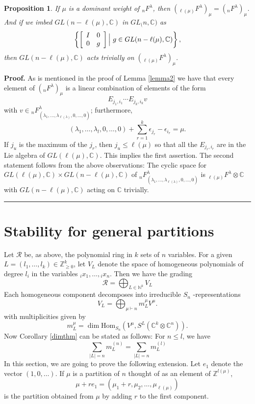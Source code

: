 \documentclass[12pt]{article}%
\newtheorem{proposition}[theorem]{Proposition}
\newenvironment{proof}[1][Proof]{\noindent\textbf{#1.} }{\ \rule{0.5em}{0.5em}}
\begin{document}
\begin{proposition}
\label{proptrivial} If $\mu$ is a dominant weight of ${}_{n}F^{\lambda}$, then
$({}_{\ell(\mu)} F^{\lambda})_{\mu}= ({}_{n}F^{\lambda})_{\mu}$. And if we
imbed $GL(n-\ell(\mu),\mathbb{C})$ in $GL_{(}n,\mathbb{C})$ as
\[
\left\{  \left[
\begin{array}
[c]{cc}%
I & 0\\
0 & g
\end{array}
\right]  \Big|~ g\in GL(n-{\ell(\mu)},\mathbb{C})\right\}  ,
\]
then $GL(n-{\ell(\mu)},\mathbb{C})$ acts trivially on $({}_{\ell(\mu)}
F^{\lambda})_{\mu}$.
\end{proposition}

\begin{proof}
As is mentioned in the proof of Lemma \ref{lemma2} we have that every element
of $({}_{n}F^{\lambda})_{\mu}$ is a linear combination of elements of the
form
\[
E_{j_{1},i_{1}}\cdots E_{j_{k},i_{k}}v
\]
with $v\in{}_{n}F_{(\lambda_{1},\dots,\lambda_{\ell(\lambda)},0,\dots
,0)}^{\lambda}$; furthermore,
\[
(\lambda_{1},\dots,\lambda_{l},0,\dots,0)+\sum_{r=1}^{k}\epsilon_{j_{r}%
}-\epsilon_{i_{r}}=\mu.
\]
If $j_{u}$ is the maximum of the $j_{r}$, then $j_{u}\leq\ell(\mu)$ so that
all the $E_{j_{r},i_{r}}$ are in the Lie algebra of $GL(\ell(\mu),\mathbb{C}%
)$. This implies the first assertion. The second statement follows from the
above observations: The cyclic space for $GL(\ell(\mu),\mathbb{C})\times
GL(n-\ell(\mu),\mathbb{C})$ of ${}_{n}F_{(\lambda_{1},\dots,\lambda
_{\ell(\lambda)},0,\dots,0)}^{\lambda}$ is ${}_{\ell(\mu)}F^{\lambda}%
\otimes\mathbb{C}$ with $GL(n-\ell(\mu),\mathbb{C})$ acting on $\mathbb{C}$ trivially.
\end{proof}

\section{Stability for general partitions}

Let $\mathcal{R}$ be, as above, the polynomial ring in $k$ sets of $n$
variables. For a given $L=(l_{1},\dots,l_{k})\in\mathbb{Z}^{k}_{\geq0}$, let
$V_{L}$ denote the space of homogeneous polynomials of degree $l_{i}$ in the
variables ${}_{i}x_{1},\dots,{}_{i}x_{n}$. Then we have the grading
\[
\mathcal{R}=\bigoplus_{L \in\mathbb{N}^{k}}V_{L}%
\]
Each homogeneous component decomposes into irreducible $S_{n}$%
-representations
\[
V_{L}=\bigoplus_{\mu\vdash n} m_{L}^{\mu} V^{\mu}.
\]
with multiplicities given by
\[
m_{L}^{\mu} = \dim\mathrm{Hom}_{S_{n}}(V^{\mu},S^{L}(\mathbb{C}^{k}%
\otimes\mathbb{C}^{n})).
\]
Now Corollary \ref{dimthm} can be stated as follows: For $n\leq l$, we have
\[
\sum_{|L|=n}m_{L}^{(n)}=\sum_{|L| = n}m_{L}^{(l)}%
\]
In this section, we are going to prove the following extension. Let $e_{1}$
denote the vector $(1,0,\dots)$. If $\mu$ is a partition of $n$ thought of as
an element of $\mathbb{Z}^{l(\mu)}$,%
\[
\mu+r e_{1}=(\mu_{1}+r,\mu_{2},\dots,\mu_{\ell(\mu)})
\]
is the partition obtained from $\mu$ by adding $r$ to the first component.
\end{document}
